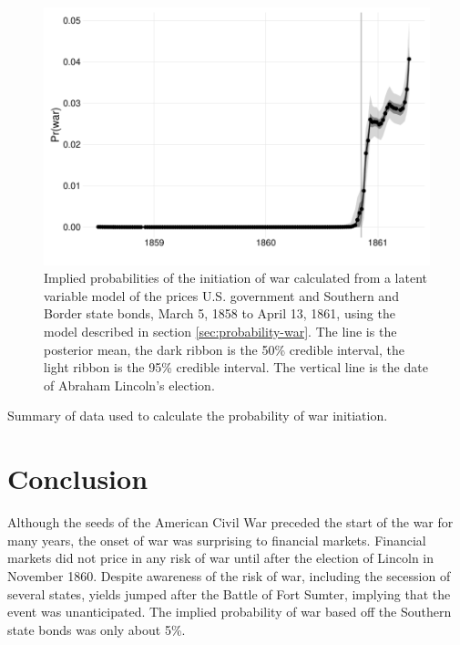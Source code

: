 \documentclass[]{article}\usepackage[]{graphicx}\usepackage[]{color}
\begin{document}
\begin{figure}
  \centering
  \includegraphics[width=\textwidth]{./figures/fig_prwar2-1}
  \caption[Implied probabilities of the initiation of war calculated from a latent variable model of the prices U.S. government and Southern and border state bonds, March  5, 1858 to April 13, 1861, using the model described in section \ref{sec:probability-war}]{
    Implied probabilities of the initiation of war calculated from a latent variable model of the prices U.S. government and Southern and Border state bonds, March  5, 1858 to April 13, 1861, using the model described in section \ref{sec:probability-war}.
    The line is the posterior mean, the dark ribbon is the 50\% credible interval, the light ribbon is the 95\% credible interval.
    The vertical line is the date of Abraham Lincoln's election.
  }
  \label{fig:prwar2}
\end{figure}

\begin{table}
  \centering
  
  \caption{Summary of data used to calculate the probability of war initiation.}
\label{tab:prwar1}
\end{table}

\section{Conclusion}
\label{sec:conclusion}

Although the seeds of the American Civil War preceded the start of the war for many years, the onset of war was surprising to financial markets.
Financial markets did not price in any risk of war until after the election of Lincoln in November 1860. 
Despite awareness of the risk of war, including the secession of several states, yields jumped after the Battle of Fort Sumter, implying that the event was unanticipated.
The implied probability of war based off the Southern state bonds was only about 5\%.
\end{document}
